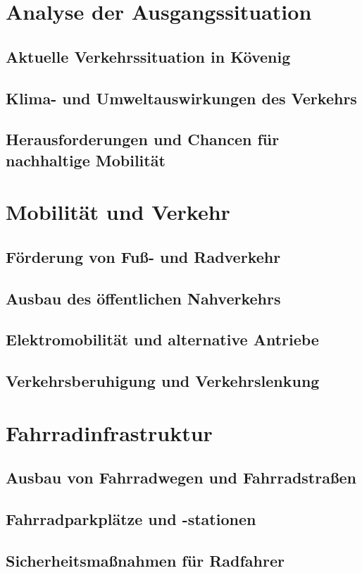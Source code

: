 	\section{Analyse der Ausgangssituation}
\subsection{Aktuelle Verkehrssituation in Kövenig}
\subsection{Klima- und Umweltauswirkungen des Verkehrs}
\subsection{Herausforderungen und Chancen für nachhaltige Mobilität}

\section{Mobilität und Verkehr}
\subsection{Förderung von Fuß- und Radverkehr}
\subsection{Ausbau des öffentlichen Nahverkehrs}
\subsection{Elektromobilität und alternative Antriebe}
\subsection{Verkehrsberuhigung und Verkehrslenkung}

\section{Fahrradinfrastruktur}
\subsection{Ausbau von Fahrradwegen und Fahrradstraßen}
\subsection{Fahrradparkplätze und -stationen}
\subsection{Sicherheitsmaßnahmen für Radfahrer}


